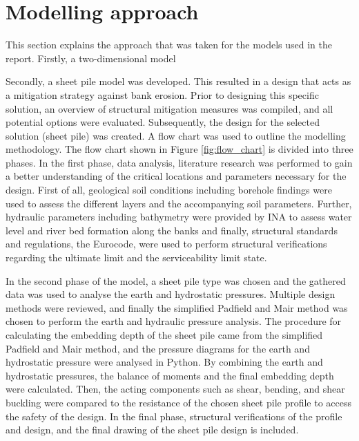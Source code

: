 \section{Modelling approach}
This section explains the approach that was taken for the models used in the report. Firstly, a two-dimensional model

Secondly, a sheet pile model was developed. This resulted in a design that acts as a mitigation strategy against bank erosion. Prior to designing this specific solution, an overview of structural mitigation measures was compiled, and all potential options were evaluated. Subsequently, the design for the selected solution (sheet pile) was created. A flow chart was used to outline the modelling methodology. The flow chart shown in Figure \ref{fig:flow_chart} is divided into three phases. In the first phase, data analysis, literature research was performed to gain a better understanding of the critical locations and parameters necessary for the design. First of all, geological soil conditions including borehole findings were used to assess the different layers and the accompanying soil parameters. Further, hydraulic parameters including bathymetry were provided by INA to assess water level and river bed formation along the banks and finally, structural standards and regulations, the Eurocode, were used to perform structural verifications regarding the ultimate limit and the serviceability limit state.

In the second phase of the model, a sheet pile type was chosen and the gathered data was used to analyse the earth and hydrostatic pressures. Multiple design methods were reviewed, and finally the simplified Padfield and Mair method was chosen to perform the earth and hydraulic pressure analysis. The procedure for calculating the embedding depth of the sheet pile came from the simplified Padfield and Mair method, and the pressure diagrams for the earth and hydrostatic pressure were analysed in Python. By combining the earth and hydrostatic pressures, the balance of moments and the final embedding depth were calculated. Then, the acting components such as shear, bending, and shear buckling were compared to the resistance of the chosen sheet pile profile to access the safety of the design. In the final phase, structural verifications of the profile and design, and the final drawing of the sheet pile design is included.


